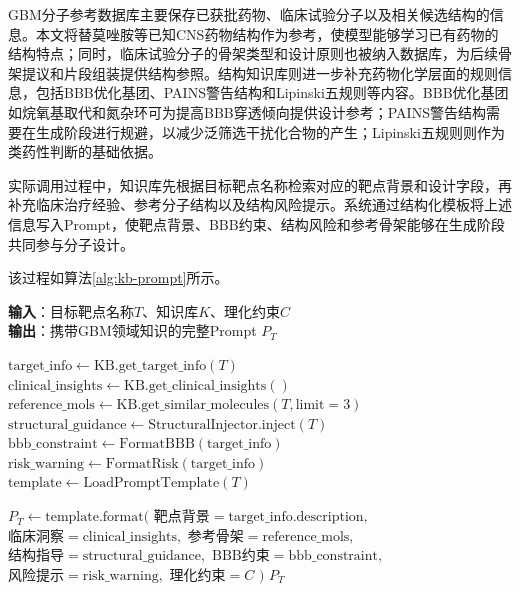GBM分子参考数据库主要保存已获批药物、临床试验分子以及相关候选结构的信息。本文将替莫唑胺等已知CNS药物结构作为参考，使模型能够学习已有药物的结构特点\cite{Stupp2005}；同时，临床试验分子的骨架类型和设计原则也被纳入数据库，为后续骨架提议和片段组装提供结构参照\cite{Fu2025}。结构知识库则进一步补充药物化学层面的规则信息，包括BBB优化基团、PAINS警告结构和Lipinski五规则等内容。BBB优化基团如烷氧基取代和氮杂环可为提高BBB穿透倾向提供设计参考\cite{Ferraris2020}；PAINS警告结构需要在生成阶段进行规避，以减少泛筛选干扰化合物的产生\cite{Baell2010}；Lipinski五规则则作为类药性判断的基础依据\cite{Pardridge2012}。

实际调用过程中，知识库先根据目标靶点名称检索对应的靶点背景和设计字段，再补充临床治疗经验、参考分子结构以及结构风险提示。系统通过结构化模板将上述信息写入Prompt，使靶点背景、BBB约束、结构风险和参考骨架能够在生成阶段共同参与分子设计。

该过程如算法\ref{alg:kb-prompt}所示。

\begin{algorithm}
\caption{基于知识库检索的Prompt构建算法}
\label{alg:kb-prompt}
\textbf{输入}：目标靶点名称$T$、知识库$K$、理化约束$C$ \\
\textbf{输出}：携带GBM领域知识的完整Prompt $P_T$

\begin{algorithmic}[1]
    \State $\text{target\_info} \leftarrow \text{KB.get\_target\_info}(T)$    
    \State $\text{clinical\_insights} \leftarrow \text{KB.get\_clinical\_insights}()$    
    \State $\text{reference\_mols} \leftarrow \text{KB.get\_similar\_molecules}(T, \text{limit}=3)$    
    \State $\text{structural\_guidance} \leftarrow \text{StructuralInjector.inject}(T)$    
    \State $\text{bbb\_constraint} \leftarrow \text{FormatBBB}(\text{target\_info})$    
    \State $\text{risk\_warning} \leftarrow \text{FormatRisk}(\text{target\_info})$    
    \State $\text{template} \leftarrow \text{LoadPromptTemplate}(T)$    

    \State $P_T \leftarrow \text{template.format}($
        \Statex \hspace{1.2em} $\text{靶点背景}=\text{target\_info.description},$
        \Statex \hspace{1.2em} $\text{临床洞察}=\text{clinical\_insights},$
        \Statex \hspace{1.2em} $\text{参考骨架}=\text{reference\_mols},$
        \Statex \hspace{1.2em} $\text{结构指导}=\text{structural\_guidance},$
        \Statex \hspace{1.2em} $\text{BBB约束}=\text{bbb\_constraint},$
        \Statex \hspace{1.2em} $\text{风险提示}=\text{risk\_warning},$
        \Statex \hspace{1.2em} $\text{理化约束}=C$
    \State $)$
    \State \Return $P_T$
\EndFunction
\end{algorithmic}
\end{algorithm}

